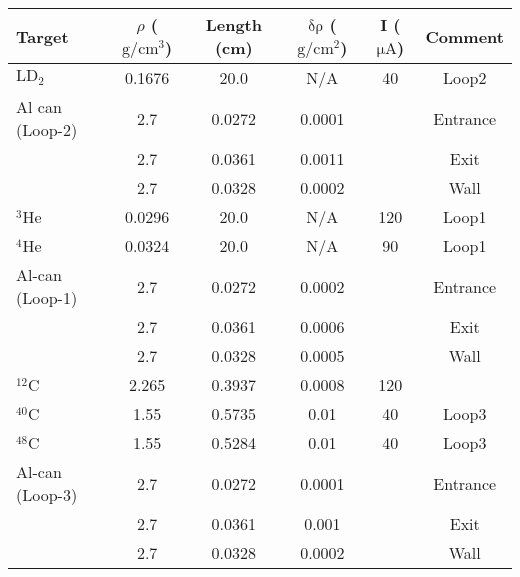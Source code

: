 \documentclass[a4paper,12.pt]{article}
\begin{document}
\begin{table}[htbp]
   \begin{tabular}{lccccc}
   \toprule
   Target       &$\rho$ ($\mathrm{g/cm^{3}}$)& Length (cm)   & $\mathrm{\delta\rho}$ ($\mathrm{g/cm^{2}}$)& I ($\mathrm{\mu A}$)& Comment   \\
   \midrule
   $\mathrm{LD_{2}}$& 0.1676                 & 20.0          &     N/A                & 40          &Loop2      \\
   Al can (Loop-2)  & 2.7                    & 0.0272        &     0.0001             &             &  Entrance\\
                    & 2.7                    & 0.0361        &     0.0011             &             &  Exit     \\
                    & 2.7                    & 0.0328        &     0.0002             &             &  Wall     \\
   $\mathrm{^{3}He}$& 0.0296                 & 20.0          &     N/A                &120         &  Loop1    \\
   $\mathrm{^{4}He}$& 0.0324                 & 20.0          &     N/A                &90           &  Loop1    \\
   Al-can (Loop-1)  & 2.7                    & 0.0272        &     0.0002             &             &  Entrance \\
                    & 2.7                    & 0.0361        &     0.0006             &             &  Exit     \\
                    & 2.7                    & 0.0328        &     0.0005             &             &  Wall     \\
   $\mathrm{^{12}C}$&      2.265             & 0.3937        &     0.0008             &120          &           \\
   $\mathrm{^{40}C}$&      1.55              & 0.5735        &     0.01               &40           &  Loop3    \\
   $\mathrm{^{48}C}$&      1.55              & 0.5284        &     0.01               &40           &  Loop3    \\
   Al-can (Loop-3)  & 2.7                    & 0.0272        &     0.0001             &             &  Entrance \\
                    & 2.7                    & 0.0361        &     0.001             &              &  Exit     \\
                    & 2.7                    & 0.0328        &     0.0002             &             &  Wall     \\

\end{tabular}
\end{table}
\end{document}
